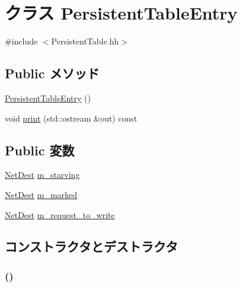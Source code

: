 \hypertarget{classPersistentTableEntry}{
\section{クラス PersistentTableEntry}
\label{classPersistentTableEntry}
}


{\ttfamily \#include $<$PersistentTable.hh$>$}\subsection*{Public メソッド}
\begin{DoxyCompactItemize}
\item 
\hyperlink{classPersistentTableEntry_aa13abed7dd03747030766becd12988b6}{PersistentTableEntry} ()
\item 
void \hyperlink{classPersistentTableEntry_ac55fe386a101fbae38c716067c9966a0}{print} (std::ostream \&out) const 
\end{DoxyCompactItemize}
\subsection*{Public 変数}
\begin{DoxyCompactItemize}
\item 
\hyperlink{classNetDest}{NetDest} \hyperlink{classPersistentTableEntry_a1365c21e7b3cf76bed4ec5a61d5298b0}{m\_\-starving}
\item 
\hyperlink{classNetDest}{NetDest} \hyperlink{classPersistentTableEntry_a3b7db11cf59baf77d617f3daa2973aa9}{m\_\-marked}
\item 
\hyperlink{classNetDest}{NetDest} \hyperlink{classPersistentTableEntry_ac1f16018ee9ebca87c4b1eed2b8cd0ee}{m\_\-request\_\-to\_\-write}
\end{DoxyCompactItemize}


\subsection{コンストラクタとデストラクタ}
\hypertarget{classPersistentTableEntry_aa13abed7dd03747030766becd12988b6}{
\subsubsection[{PersistentTableEntry}]{ ()}}
\label{classPersistentTableEntry_aa13abed7dd03747030766becd12988b6}




